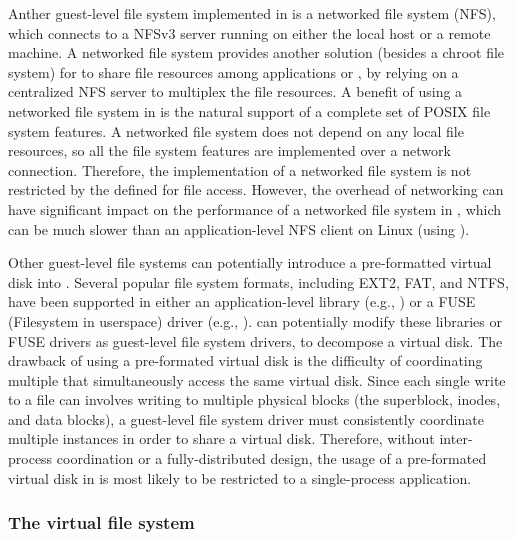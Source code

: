 Anther guest-level file system implemented in \thelibos{}
is a networked file system (NFS), which connects to a NFSv3 server running on either the local host or a remote machine.
A networked file system provides another solution (besides a chroot file system)
for \thelibos{} to share file resources among applications or \picoprocs{}, by relying on a centralized NFS server to multiplex the file resources. 
A benefit of using a networked file system in \thelibos{}
is the natural support of a complete set of POSIX file system features.
A networked file system does not depend on any local file resources, so all the file system features are implemented over a network connection.
Therefore, the implementation of a networked file system is not restricted by
the \hostapis{} defined for file access.
However, 
the overhead of networking \hostapis{}
can have significant impact on
the performance of a networked file system in \thelibos{},
which can be
much slower than an application-level NFS client on Linux (using ).





Other guest-level file systems can potentially introduce a pre-formatted virtual disk into \thelibos{}.
Several popular file system formats,
including EXT2, FAT, and NTFS, have been supported in either an application-level library (e.g., ) or a FUSE (Filesystem in userspace) driver (e.g., ).
\thelibos{} can potentially modify
these libraries or FUSE drivers as guest-level file system drivers,
to decompose a virtual disk.
The drawback of using a pre-formated virtual disk
is the difficulty of coordinating multiple \picoprocs{} that simultaneously access the same virtual disk.
Since each single write to a file can involves writing to multiple physical blocks (the superblock, inodes, and data blocks),
a guest-level file system driver must consistently coordinate multiple \thelibos{} instances in order to share a virtual disk.
Therefore, without inter-process coordination or a fully-distributed design, the usage of a pre-formated virtual disk in \thelibos{}
is most likely to be restricted to a single-process application.




\subsubsection{The virtual file system}
\label{sec:libos:vfs}


